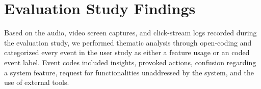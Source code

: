 \section{Evaluation Study Findings\label{sec:eval_findings}}
Based on the audio, video screen captures, and click-stream logs recorded during the evaluation study, we performed thematic analysis through open-coding and categorized every event in the user study as either a feature usage or an coded event label. Event codes included insights, provoked actions, confusion regarding a system feature, request for functionalities unaddressed by the system, and the use of external tools.
